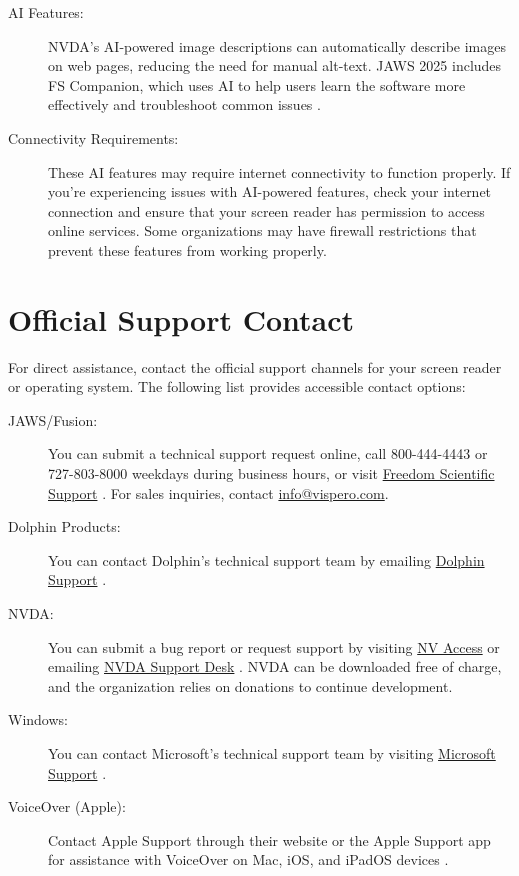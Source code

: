 \begin{description}
	\item[AI Features:] NVDA's AI-powered image descriptions can automatically describe images on web pages, reducing the need for manual alt-text. JAWS 2025 includes FS Companion, which uses AI to help users learn the software more effectively and troubleshoot common issues \cite{NarratorImageDescriptions, JAWSAILabeler}.
	\item[Connectivity Requirements:] These AI features may require internet connectivity to function properly. If you're experiencing issues with AI-powered features, check your internet connection and ensure that your screen reader has permission to access online services. Some organizations may have firewall restrictions that prevent these features from working properly.
\end{description}

\section{Official Support Contact}
\label{app1:report}
For direct assistance, contact the official support channels for your screen reader or operating system. The following list provides accessible contact options:

\begin{description}
	\item[JAWS/Fusion:] You can submit a technical support request online, call 800-444-4443 or 727-803-8000 weekdays during business hours, or visit \href{https://support.freedomscientific.com/support}{Freedom Scientific Support} \cite{FreedomScientificJAWS}. For sales inquiries, contact \href{mailto:info@vispero.com}{info@vispero.com}.
	\item[Dolphin Products:] You can contact Dolphin's technical support team by emailing \href{mailto:support@yourdolphin.com}{Dolphin Support} \cite{DolphinScreenreaderRequirements}.
	\item[NVDA:] You can submit a bug report or request support by visiting \href{https://www.nvaccess.org/}{NV Access} or emailing \href{mailto:info@nvaccess.org}{NVDA Support Desk} \cite{NVAccess}. NVDA can be downloaded free of charge, and the organization relies on donations to continue development.
	\item[Windows:] You can contact Microsoft's technical support team by visiting \href{https://support.microsoft.com/}{Microsoft Support} \cite{MicrosoftAccessibility, DisabilityAnswerDesk}.
	\item[VoiceOver (Apple):] Contact Apple Support through their website or the Apple Support app for assistance with VoiceOver on Mac, iOS, and iPadOS devices \cite{AppleAccessibility}.
\end{description}


